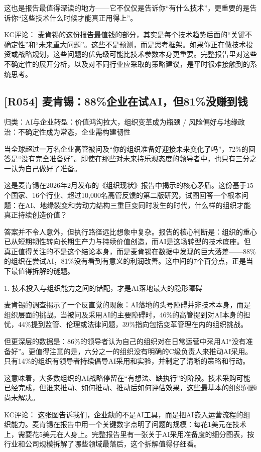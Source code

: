 \documentclass[11pt]{ctexart}
\begin{document}
这也是报告最值得深读的地方——它不仅仅是告诉你“有什么技术”，更重要的是告诉你“这些技术什么时候才能真正用得上”。

KC评论： 麦肯锡的这份报告最值钱的部分，其实是每个技术趋势后面的“关键不确定性”和“未来重大问题”。这些不是预测，而是思考框架。如果你正在做技术投资或战略规划，这些问题的优先级可能比技术参数本身更重要。完整报告里对这些不确定性的展开分析，以及对不同行业应采取的策略建议，是平时很难接触到的系统思考。

\subsection{[R054] 麦肯锡：88\%企业在试AI，但81\%没赚到钱}
{\small\color{refgray}归类：AI与企业转型：价值鸿沟拉大，组织变革成为瓶颈 / 风险偏好与地缘政治：不确定性成为常态，企业需构建韧性}

当全球超过一万名企业高管被问及“你的组织准备好迎接未来变化了吗”，72\%的回答是“没有完全准备好”。即使在那些对未来持乐观态度的领导者中，也只有三分之一认为自己做好了准备。

这是麦肯锡在2026年2月发布的《组织现状》报告中揭示的核心矛盾。这份基于15个国家、16个行业、超过10,000名高管反馈的第二版研究，试图回答一个根本问题：在AI、地缘裂变和劳动力结构三重巨变同时发生的时代，什么样的组织才能真正持续创造价值？

答案并不令人意外，但执行路径远比想象中复杂。报告的核心判断是：组织的重心已从短期韧性转向长期生产力与持续价值创造，而AI是这场转型的技术底座。但真正值得关注的不是这个结论本身，而是麦肯锡在数据中发现的巨大落差——88\%的组织在尝试AI，81\%没有看到有意义的利润改善。这中间的7个百分点，正是当下最值得拆解的谜题。

1. 技术投入与组织能力之间的错配，才是AI落地最大的隐形障碍

麦肯锡的调查揭示了一个反直觉的现象：AI落地的头号障碍并非技术本身，而是组织层面的挑战。当被问及采用AI的主要障碍时，46\%的高管提到对AI本身的担忧，44\%提到监管、伦理或法律问题，39\%指向包括变革管理在内的组织挑战。

但更深层的数据是：86\%的领导者认为自己的组织对在日常运营中采用AI“没有准备好”。更值得注意的是，六分之一的组织没有明确的C级负责人来推动AI采用。只有14\%的组织有领导者持续倡导AI采用和实验，并制定了清晰的策略和行动。

这意味着，大多数组织的AI战略停留在“有想法、缺执行”的阶段。技术采购可能已经完成，但谁来推动、如何推动、推动后如何评估效果，这些最基本的组织问题尚未解决。

KC评论： 这张图告诉我们，企业缺的不是AI工具，而是把AI嵌入运营流程的组织能力。麦肯锡在报告中用一个关键数字点明了问题的规模：每花1美元在技术上，需要花5美元在人身上。完整报告里有一张关于AI采用准备度的细分图表，按行业和公司规模拆解了哪些领域最落后，这个拆解值得仔细看。
\end{document}
